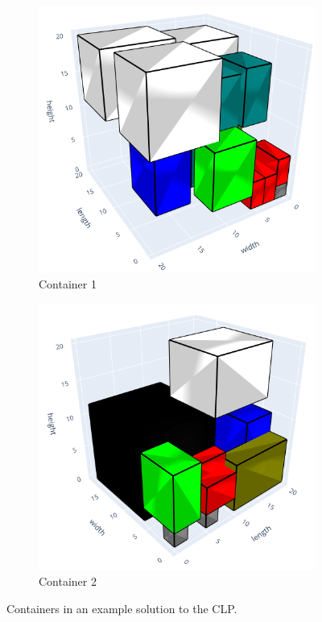 \begin{figure}[h]
    \centering
    \begin{subfigure}{.4\textwidth}
        \centering
        \includegraphics[width=\linewidth]{images/ChenExampleContainer1.png}
        \caption{Container 1}
    \end{subfigure}
    \begin{subfigure}{.5\textwidth}
        \centering
        \includegraphics[width=0.8\linewidth]{images/ChenExampleContainer2.png}
        \caption{Container 2}
    \end{subfigure}
    \caption{Containers in an example solution to the CLP.}
    \label{fig:clp example solution}
\end{figure}

